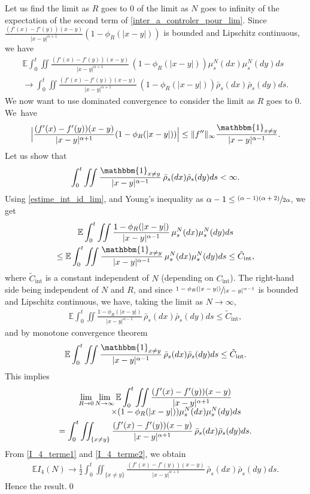 \documentclass[JEP,XML,SOM,Unicode,published]{cedram}
\let\mathds\mathbbm
\newcommand{\rint}{\mathrm{int}}
\theoremstyle{plain}
\theoremstyle{definition}
\begin{document}
Let us find the limit as $R$ goes to 0 of the limit as $N$ goes to infinity of the expectation of the second term of \eqref{inter_a_controler_pour_lim}. Since $\frac{(f'(x)-f'(y))(x-y)}{|x-y|^{\alpha+1}}(1-\phi_R(|x-y|))$ is bounded and Lipschitz continuous, we have
\begin{multline*}
\mathbb{E}\int_{0}^t\iint\frac{(f'(x)-f'(y))(x-y)}{|x-y|^{\alpha+1}}\,(1-\phi_R(|x-y|))\mu^N_s(dx)\mu^N_s(dy)ds\\
\to\int_{0}^t\iint\frac{(f'(x)-f'(y))(x-y)}{|x-y|^{\alpha+1}}\,(1-\phi_R(|x-y|))\bar{\rho}_s(dx)\bar{\rho}_s(dy)ds.
\end{multline*}
We now want to use dominated convergence to consider the limit as $R$ goes to $0$. We~have
\begin{align*}
\Bigl|\frac{(f'(x)-f'(y))(x-y)}{|x-y|^{\alpha+1}}(1-\phi_R(|x-y|))\Bigr|\leq \|f''\|_{\infty} \frac{\mathds{1}_{x\neq y}}{|x-y|^{\alpha-1}}.
\end{align*}
Let us show that
\[
\int_{0}^t\iint\frac{\mathds{1}_{x\neq y}}{|x-y|^{\alpha-1}}\,\bar{\rho}_s(dx)\bar{\rho}_s(dy)ds<\infty.
\]
Using \eqref{estime_int_id_lim}, and Young's inequality as ${\alpha-1\leq\sfrac{(\alpha-1)(\alpha+2)}{2\alpha}}$, we get
\begin{multline*}
\mathbb{E}\int_{0}^t\iint\frac{1-\phi_R(|x-y|)}{|x-y|^{\alpha-1}}\,\mu^N_s(dx)\mu^N_s(dy)ds\\
\leq \mathbb{E}\int_{0}^t\iint\frac{\mathds{1}_{x\neq y}}{|x-y|^{\alpha-1}}\,\mu^N_s(dx)\mu^N_s(dy)ds\leq \tilde{C}_{\rint},
\end{multline*}
where $\tilde{C}_{\rint}$ is a constant independent of $N$ (depending on $C_{\rint}$). The right-hand side being independent of $N$ and $R$, and since $\sfrac{1-\phi_R(|x-y|)}{|x-y|^{\alpha-1}}$ is bounded and Lipschitz continuous, we have, taking the limit as $N\to\infty$,
\begin{align*}
\mathbb{E}\int_{0}^t\iint\frac{1-\phi_R(|x-y|)}{|x-y|^{\alpha-1}}\,\bar{\rho}_s(dx)\bar{\rho}_s(dy)ds\leq \tilde{C}_{\rint},
\end{align*}
and by monotone convergence theorem
\begin{align*}
\mathbb{E}\int_{0}^t\iint\frac{\mathds{1}_{x\neq y}}{|x-y|^{\alpha-1}}\,\bar{\rho}_s(dx)\bar{\rho}_s(dy)ds\leq \tilde{C}_{\rint}.
\end{align*}
This implies
\begin{multline}
\lim_{R\to 0}\lim_{N\to \infty}\mathbb{E}\int_{0}^t\iint\frac{(f'(x)-f'(y))(x-y)}{|x-y|^{\alpha+1}}\\[-5pt]
\shoveright{\times(1-\phi_R(|x-y|))\mu^N_s(dx)\mu^N_s(dy)ds\hphantom{.}}\\
=\int_{0}^t\iint_{\{x\neq y\}}\frac{(f'(x)-f'(y))(x-y)}{|x-y|^{\alpha+1}}\,\bar{\rho}_s(dx)\bar{\rho}_s(dy)ds\label{I_4_terme2}.
\end{multline}
From \eqref{I_4_terme1} and \eqref{I_4_terme2}, we obtain
\begin{align*}
\mathbb{E}I_4(N)\to\frac{1}{2}\int_{0}^t\iint_{\{x\neq y\}}\frac{(f'(x)-f'(y))(x-y)}{|x-y|^{\alpha+1}}\,\bar{\rho}_s(dx)\bar{\rho}_s(dy)ds.
\end{align*}
Hence the result.\qed
\end{document}
